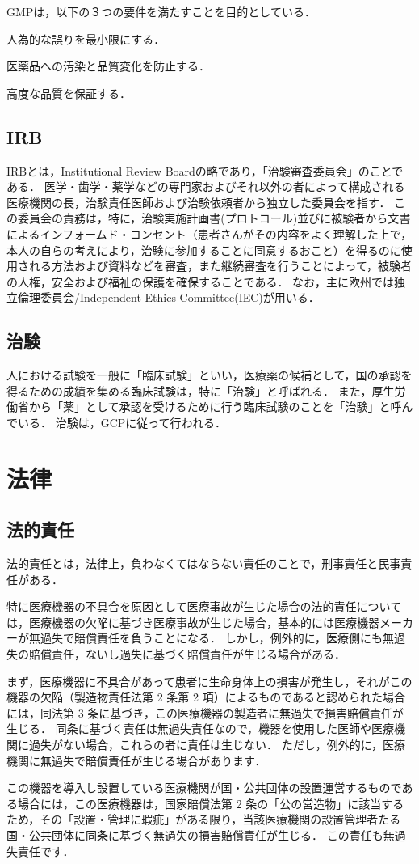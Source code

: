 \documentclass[uplatex,a4paper]{jsarticle}
\begin{document}
GMPは，以下の３つの要件を満たすことを目的としている．

人為的な誤りを最小限にする．

医薬品への汚染と品質変化を防止する．

高度な品質を保証する．


\subsection{IRB}
IRBとは，Institutional Review Boardの略であり，「治験審査委員会」のことである．
医学・歯学・薬学などの専門家およびそれ以外の者によって構成される医療機関の長，治験責任医師および治験依頼者から独立した委員会を指す．
この委員会の責務は，特に，治験実施計画書(プロトコール)並びに被験者から文書によるインフォームド・コンセント（患者さんがその内容をよく理解した上で，本人の自らの考えにより，治験に参加することに同意するおこと）を得るのに使用される方法および資料などを審査，また継続審査を行うことによって，被験者の人権，安全および福祉の保護を確保することである．
なお，主に欧州では独立倫理委員会/Independent Ethics Committee(IEC)が用いる．


\subsection{治験}
人における試験を一般に「臨床試験」といい，医療薬の候補として，国の承認を得るための成績を集める臨床試験は，特に「治験」と呼ばれる．
また，厚生労働省から「薬」として承認を受けるために行う臨床試験のことを「治験」と呼んでいる．
治験は，GCPに従って行われる．




\section{法律}
\subsection{法的責任}
法的責任とは，法律上，負わなくてはならない責任のことで，刑事責任と民事責任がある．

特に医療機器の不具合を原因として医療事故が生じた場合の法的責任については，医療機器の欠陥に基づき医療事故が生じた場合，基本的には医療機器メーカーが無過失で賠償責任を負うことになる．
しかし，例外的に，医療側にも無過失の賠償責任，ないし過失に基づく賠償責任が生じる場合がある．

まず，医療機器に不具合があって患者に生命身体上の損害が発生し，それがこの機器の欠陥（製造物責任法第 2 条第 2 項）によるものであると認められた場合には，同法第 3 条に基づき，この医療機器の製造者に無過失で損害賠償責任が生じる．
同条に基づく責任は無過失責任なので，機器を使用した医師や医療機関に過失がない場合，これらの者に責任は生じない．
ただし，例外的に，医療機関に無過失で賠償責任が生じる場合があります．

この機器を導入し設置している医療機関が国・公共団体の設置運営するものである場合には，この医療機器は，国家賠償法第 2 条の「公の営造物」に該当するため，その「設置・管理に瑕疵」がある限り，当該医療機関の設置管理者たる国・公共団体に同条に基づく無過失の損害賠償責任が生じる．
この責任も無過失責任です．

~\cite{qi2016volumetric}

%
%



\end{document}
